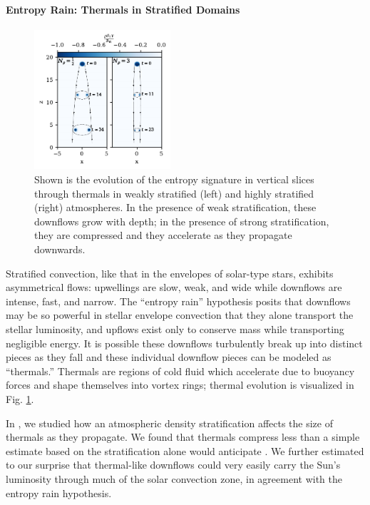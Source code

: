 \documentclass[preprint, hmargin=1in, vmargin=1in]{aastex62}
\begin{document}
\paragraph{Entropy Rain: Thermals in Stratified Domains}
\begin{figure}
	\begin{center}
	\vspace{-42pt}
    \includegraphics[width=0.45\textwidth]{./figs/evolution_colormeshes.pdf}
	\vspace{-16pt}
	\end{center}
    \caption{
	\citep[Fig.~2 of][]{andersLB2019} Shown is the evolution of the entropy signature in vertical slices through thermals in weakly stratified (left) and highly stratified (right) atmospheres.
	In the presence of weak stratification, these downflows grow with depth; in the presence of strong stratification, they are compressed and they accelerate as they propagate downwards.
	\label{fig:thermals} }
	\vspace{-22pt}
\end{figure}

Stratified convection, like that in the envelopes of solar-type stars, exhibits asymmetrical flows: upwellings are slow, weak, and wide while downflows are intense, fast, and narrow.
The ``entropy rain'' hypothesis posits that downflows may be so powerful in stellar envelope convection that they alone transport the stellar luminosity, and upflows exist only to conserve mass while transporting negligible energy.
It is possible these downflows turbulently break up into distinct pieces as they fall and these individual downflow pieces can be modeled as ``thermals.''
Thermals are regions of cold fluid which accelerate due to buoyancy forces and shape themselves into vortex rings; thermal evolution is visualized in Fig. \ref{fig:thermals}.

In \citet{andersLB2019}, we studied how an atmospheric density stratification affects the size of thermals as they propagate.
We found that thermals compress less than a simple estimate based on the stratification alone would anticipate \citep{brandenburg2016}.
We further estimated to our surprise that thermal-like downflows could very easily carry the Sun's luminosity through much of the solar convection zone, in agreement with the entropy rain hypothesis.
\end{document}
